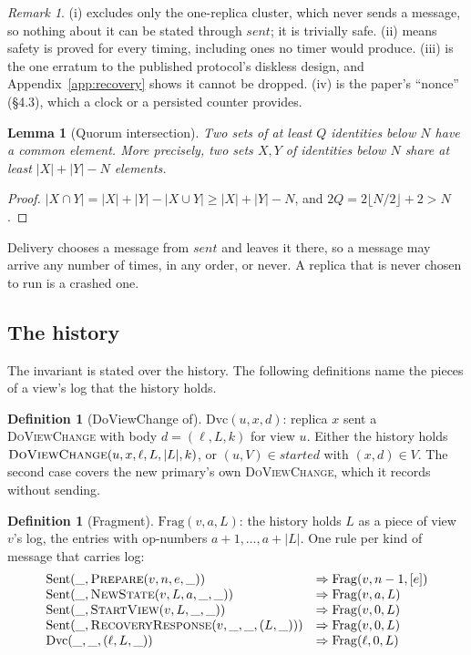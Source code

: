 \documentclass[11pt,a4paper]{article}
\theoremstyle{plain}
\newtheorem{lemma}[theorem]{Lemma}
\theoremstyle{definition}
\newtheorem{definition}[theorem]{Definition}
\theoremstyle{remark}
\newtheorem{remark}[theorem]{Remark}
\newcommand{\msg}[1]{\textsc{#1}}
\newcommand{\dvc}{\msg{DoViewChange}}
\newcommand{\Frag}{\mathrm{Frag}}
\newcommand{\Sent}{\mathrm{Sent}}
\newcommand{\sent}{\mathit{sent}}
\newcommand{\started}{\mathit{started}}
\begin{document}
\begin{remark}
(i) excludes only the one-replica cluster, which never sends a message,
so nothing about it can be stated through $\sent$; it is trivially safe.
(ii) means safety is proved for every timing, including ones no timer
would produce. (iii) is the one erratum to the published protocol's
diskless design, and Appendix~\ref{app:recovery} shows it cannot be
dropped. (iv) is the paper's ``nonce'' (\S4.3), which a clock or a
persisted counter provides.
\end{remark}

\begin{lemma}[Quorum intersection]
\label{lem:quorum}
Two sets of at least $Q$ identities below $N$ have a common element.
More precisely, two sets $X, Y$ of identities below $N$ share at least
$|X| + |Y| - N$ elements.
\end{lemma}
\begin{proof}
$|X \cap Y| = |X| + |Y| - |X \cup Y| \ge |X| + |Y| - N$, and
$2Q = 2\lfloor N/2 \rfloor + 2 > N$.
\end{proof}

Delivery chooses a message from $\sent$ and leaves it there, so a
message may arrive any number of times, in any order, or never. A
replica that is never chosen to run is a crashed one.

\subsection{The history}

The invariant is stated over the history. The following definitions name
the pieces of a view's log that the history holds.

\begin{definition}[DoViewChange of]
\label{def:dvcof}
$\mathrm{Dvc}(u, x, d)$: replica $x$ sent a \dvc{} with body
$d = (\ell, L, k)$ for view $u$. Either the history holds
$\dvc(u, x, \ell, L, |L|, k)$, or $(u, V) \in \started$ with
$(x, d) \in V$. The second case covers the new primary's own \dvc{},
which it records without sending.
\end{definition}

\begin{definition}[Fragment]
\label{def:frag}
$\Frag(v, a, L)$: the history holds $L$ as a piece of view $v$'s log,
the entries with op-numbers $a+1, \dots, a+|L|$. One rule per kind of
message that carries log:
\[
\begin{array}{ll}
\Sent(\_, \msg{Prepare}(v, n, e, \_)) & \Rightarrow \Frag(v, n-1, [e]) \\
\Sent(\_, \msg{NewState}(v, L, a, \_, \_)) & \Rightarrow \Frag(v, a, L) \\
\Sent(\_, \msg{StartView}(v, L, \_, \_)) & \Rightarrow \Frag(v, 0, L) \\
\Sent(\_, \msg{RecoveryResponse}(v, \_, \_, (L, \_))) & \Rightarrow \Frag(v, 0, L) \\
\mathrm{Dvc}(\_, \_, (\ell, L, \_)) & \Rightarrow \Frag(\ell, 0, L)
\end{array}
\]
\end{definition}
\end{document}
